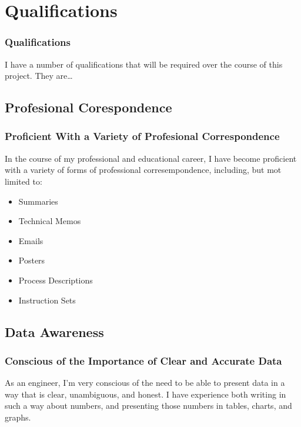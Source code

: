 \documentclass{beamer}
\begin{document}
\section{Qualifications}
\begin{frame}
  \frametitle{Qualifications}
  I have a number of qualifications that will be required over the course of
  this project. They are\ldots
\end{frame}

\subsection{Profesional Corespondence}
\begin{frame}
  \frametitle{Proficient With a Variety of Profesional Correspondence}
  In the course of my professional and educational career, I have become
  proficient with a variety of forms of professional corresempondence,
  including, but mot limited to:
  \begin{itemize}
    \item Summaries
    \item Technical Memos
    \item Emails
    \item Posters
    \item Process Descriptions
    \item Instruction Sets
  \end{itemize}
\end{frame}

\subsection{Data Awareness}
\begin{frame}
  \frametitle{Conscious of the Importance of Clear and Accurate Data}
  As an engineer, I'm very conscious of the need to be able to present data in
  a way that is clear, unambiguous, and honest.  I have experience both
  writing in such a way about numbers, and presenting those numbers in tables,
  charts, and graphs.
\end{frame}
\end{document}
